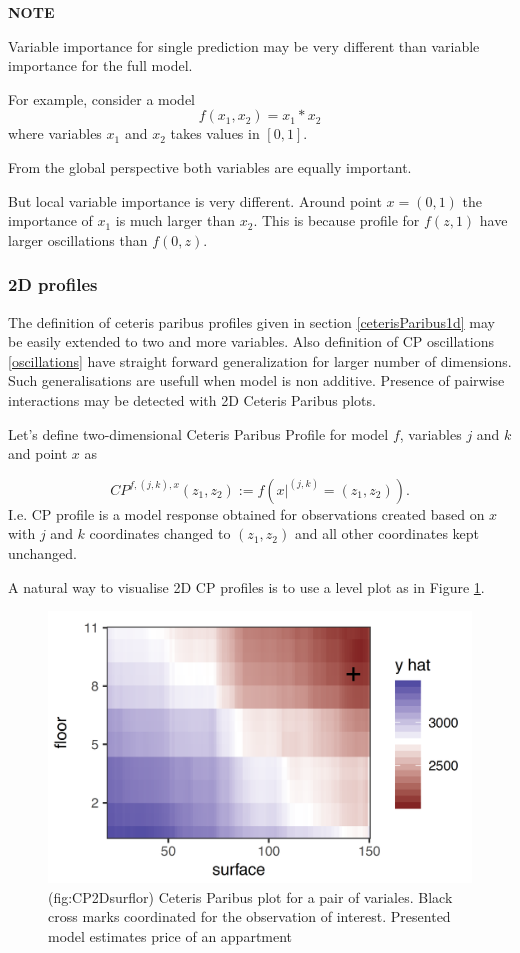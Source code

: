 \documentclass[]{krantz}
\theoremstyle{definition}
\theoremstyle{definition}
\theoremstyle{definition}
\theoremstyle{remark}
\begin{document}
\textbf{NOTE}

Variable importance for single prediction may be very different than
variable importance for the full model.

For example, consider a model \[
f(x_1, x_2) = x_1 * x_2
\] where variables \(x_1\) and \(x_2\) takes values in \([0,1]\).

From the global perspective both variables are equally important.

But local variable importance is very different. Around point
\(x = (0, 1)\) the importance of \(x_1\) is much larger than \(x_2\).
This is because profile for \(f(z, 1)\) have larger oscillations than
\(f(0, z)\).

\hypertarget{d-profiles}{%
\subsubsection{2D profiles}\label{d-profiles}}

The definition of ceteris paribus profiles given in section
\ref{ceterisParibus1d} may be easily extended to two and more variables.
Also definition of CP oscillations \ref{oscillations} have straight
forward generalization for larger number of dimensions. Such
generalisations are usefull when model is non additive. Presence of
pairwise interactions may be detected with 2D Ceteris Paribus plots.

Let's define two-dimensional Ceteris Paribus Profile for model \(f\),
variables \(j\) and \(k\) and point \(x\) as

\[
CP^{f, (j,k), x}(z_1, z_2) := f(x|^{(j,k)} = (z_1,z_2)).
\] I.e. CP profile is a model response obtained for observations created
based on \(x\) with \(j\) and \(k\) coordinates changed to
\((z_1, z_2)\) and all other coordinates kept unchanged.

A natural way to visualise 2D CP profiles is to use a level plot as in
Figure \ref{fig:CP2Dsurflor}.

\begin{figure}

{\centering \includegraphics[width=0.6\linewidth]{figure/cp_2d_surf_floor} 

}

\caption{(fig:CP2Dsurflor) Ceteris Paribus plot for a pair of variales. Black cross marks coordinated for the observation of interest. Presented model estimates price of an appartment}\label{fig:CP2Dsurflor}
\end{figure}
\end{document}
